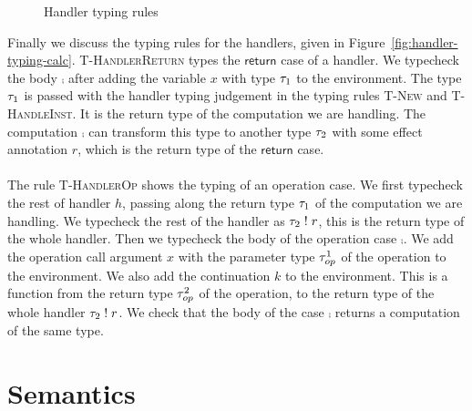 {\begin{figure}[h]
\caption{Handler typing rules}
\centering
{}
\end{figure}

Finally we discuss the typing rules for the handlers, given in Figure~\ref{fig:handler-typing-calc}.
\textsc{T-HandlerReturn} types the $\mathsf{return}$ case of a handler.
We typecheck the body $\comp$ after adding the variable $x$ with type $\tau_1$ to the environment.
The type $\tau_1$ is passed with the handler typing judgement in the typing rules \textsc{T-New} and \textsc{T-HandleInst}.
It is the return type of the computation we are handling.
The computation $\comp$ can transform this type to another type $\tau_2$ with some effect annotation $r$, which is the return type of the $\mathsf{return}$ case.
\\\\
The rule \textsc{T-HandlerOp} shows the typing of an operation case.
We first typecheck the rest of handler $h$, passing along the return type $\tau_1$ of the computation we are handling.
We typecheck the rest of the handler as $\tau_2 \; ! \; r$, this is the return type of the whole handler.
Then we typecheck the body of the operation case $\comp$.
We add the operation call argument $x$ with the parameter type $\tau^1_{op}$ of the operation to the environment.
We also add the continuation $k$ to the environment.
This is a function from the return type $\tau^2_{op}$ of the operation, to the return type of the whole handler $\tau_2 \; ! \; r$.
We check that the body of the case $\comp$ returns a computation of the same type.

\section{Semantics}
\label{sec:semantics}

}
